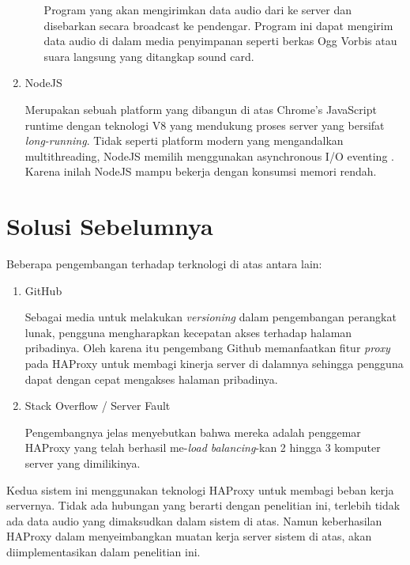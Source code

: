 \begin{enumerate}
\begin{enumerate}
        Program yang akan mengirimkan data audio dari ke server dan disebarkan secara broadcast ke pendengar. Program ini dapat mengirim data audio di dalam media penyimpanan seperti berkas Ogg Vorbis atau suara langsung yang ditangkap sound card.
    \end{enumerate}
    
    \item NodeJS
    
    Merupakan sebuah platform yang dibangun di atas Chrome's JavaScript runtime dengan teknologi V8 yang mendukung proses server yang bersifat \textit{long-running}. Tidak seperti platform modern yang mengandalkan multithreading, NodeJS memilih menggunakan asynchronous I/O eventing \cite{nodejsieee}. Karena inilah NodeJS mampu bekerja dengan konsumsi memori rendah.
    
    
    
\end{enumerate}

\section{Solusi Sebelumnya}

Beberapa pengembangan terhadap terknologi di atas antara lain:

\begin{enumerate}
    \item GitHub
    
    Sebagai media untuk melakukan \textit{versioning} dalam pengembangan perangkat lunak, pengguna mengharapkan kecepatan akses terhadap halaman pribadinya. Oleh karena itu pengembang Github memanfaatkan fitur \textit{proxy} pada HAProxy untuk membagi kinerja server di dalamnya sehingga pengguna dapat dengan cepat mengakses halaman pribadinya. \cite{hause}
    
    \item Stack Overflow / Server Fault
    
    Pengembangnya jelas menyebutkan bahwa mereka adalah penggemar HAProxy yang telah berhasil me-\textit{load balancing}-kan 2 hingga 3 komputer server yang dimilikinya. \cite{hause}
\end{enumerate}

Kedua sistem ini menggunakan teknologi HAProxy untuk membagi beban kerja servernya. Tidak ada hubungan yang berarti dengan penelitian ini, terlebih tidak ada data audio yang dimaksudkan dalam sistem di atas. Namun keberhasilan HAProxy dalam menyeimbangkan muatan kerja server sistem di atas, akan diimplementasikan dalam penelitian ini.